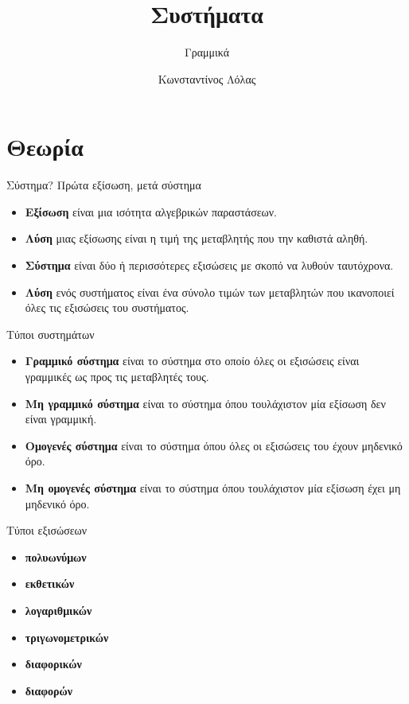 \documentclass{presentation}
\title{Συστήματα}
\subtitle{Γραμμικά}
\author[Λόλας]{Κωνσταντίνος Λόλας}
\date{}
\begin{document}
\begin{frame}
  \titlepage
\end{frame}

\section{Θεωρία}
\begin{frame}{Σύστημα?}
  Πρώτα εξίσωση, μετά σύστημα
  \begin{itemize}[<+->]
    \item \textbf{Εξίσωση} είναι μια ισότητα αλγεβρικών παραστάσεων.
    \item \textbf{Λύση} μιας εξίσωσης είναι η τιμή της μεταβλητής που την καθιστά αληθή.
    \item \textbf{Σύστημα} είναι δύο ή περισσότερες εξισώσεις με σκοπό να λυθούν ταυτόχρονα.
    \item \textbf{Λύση} ενός συστήματος είναι ένα σύνολο τιμών των μεταβλητών που ικανοποιεί όλες τις εξισώσεις του συστήματος.
  \end{itemize}
\end{frame}

\begin{frame}{Τύποι συστημάτων}
  \begin{itemize}[<+->]
    \item \textbf{Γραμμικό σύστημα} είναι το σύστημα στο οποίο όλες οι εξισώσεις είναι γραμμικές ως προς τις μεταβλητές τους.
    \item \textbf{Μη γραμμικό σύστημα} είναι το σύστημα όπου τουλάχιστον μία εξίσωση δεν είναι γραμμική.
    \item \textbf{Ομογενές σύστημα} είναι το σύστημα όπου όλες οι εξισώσεις του έχουν μηδενικό όρο.
    \item \textbf{Μη ομογενές σύστημα} είναι το σύστημα όπου τουλάχιστον μία εξίσωση έχει μη μηδενικό όρο.
  \end{itemize}
\end{frame}

\begin{frame}{Τύποι εξισώσεων}
  \begin{itemize}[<+->]
    \item \textbf{πολυωνύμων}
    \item \textbf{εκθετικών}
    \item \textbf{λογαριθμικών}
    \item \textbf{τριγωνομετρικών}
    \item \textbf{διαφορικών}
    \item \textbf{διαφορών}
  \end{itemize}
\end{frame}
\end{document}
